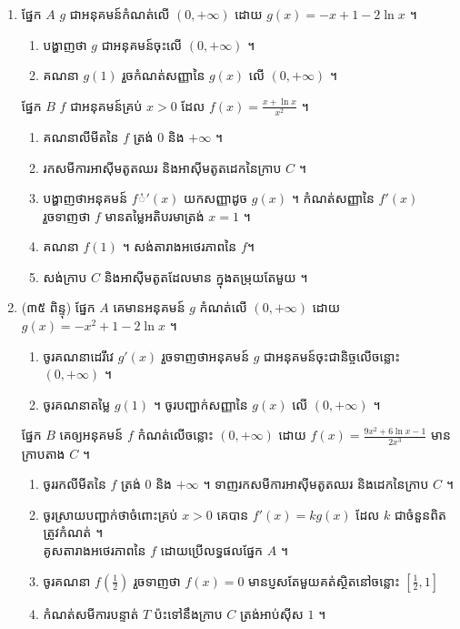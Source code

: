 \documentclass{officialexam}
\begin{document}
\begin{enumerate}[I]
\begin{enumerate}[k]
	\end{enumerate}
	\item {\color{khtug} \sffamily ផ្នែក $A$} $g$ ជាអនុគមន៍កំណត់លើ $(0,+\infty)$ ដោយ $g(x)=-x+1-2\ln x$ ។
	\begin{enumerate}[k]
		\item បង្ហាញថា $g$ ជាអនុគមន៍ចុះលើ $(0,+\infty)$ ។
		\item គណនា $g(1)$ រួចកំណត់សញ្ញានៃ $g(x)$ លើ $(0, +\infty)$ ។
	\end{enumerate}
	{\color{khtug} \sffamily ផ្នែក $B$} $f$ ជាអនុគមន៍គ្រប់ $x>0$ ដែល $f(x)=\frac{x+\ln x}{x^2}$ ។​
	\begin{enumerate}[k]
		\item គណនាលីមីតនៃ $f$ ត្រង់ $0$ និង $+\infty$ ។
		\item រកសមីការអាស៊ីមតូតឈរ និងអាស៊ីមតូតដេកនៃក្រាប $C$ ។
		\item បង្ហាញថាអនុគមន៍ $f់'(x)$ យកសញ្ញាដូច $g(x)$ ។ កំណត់សញ្ញានៃ $f'(x)$ រួចទាញថា $f$ មានតម្លៃអតិបរមាត្រង់ $x=1$ ។ 
		\item គណនា $f(1)$ ។ សង់តារាងអថេរភាពនៃ $f$​។
		\item សង់ក្រាប $C$ និងអាស៊ីមតូតដែលមាន ក្នុងតម្រុយតែមួយ ។
	\end{enumerate}
	\item {\color{khtug}(៣៥ ពិន្ទុ) \sffamily ផ្នែក $A$} គេមានអនុគមន៍ $g$ កំណត់លើ $(0, +\infty)$ ដោយ $g(x)=-x^2+1-2\ln x$ ។
	\begin{enumerate}[k]
		\item ចូរគណនាដេរីវេ $g'(x)$ រួចទាញថាអនុគមន៍ $g$ ជាអនុគមន៍ចុះជានិច្ចលើចន្លោះ $(0,+\infty)$ ។ 
		\item ចូរគណនាតម្លៃ $g(1)$ ។ ចូរបញ្ជាក់សញ្ញានៃ $g(x)$ លើ $(0, +\infty)$ ។
	\end{enumerate}
	{\color{khtug} \sffamily ផ្នែក $B$} គេឲ្យអនុគមន៍ $f$ កំណត់លើចន្លោះ $(0, +\infty)$ ដោយ $f(x)=\frac{9x^2+6\ln x-1}{2x^3}$ មានក្រាបតាង $C$ ។
	\begin{enumerate}[k]
		\item ចូររកលីមីតនៃ $f$ ត្រង់ $0$ និង $+\infty$ ។ ទាញរកសមីការអាស៊ីមតូតឈរ និងដេកនៃក្រាប $C$ ។
		\item ចូរស្រាយបញ្ជាក់ថាចំពោះគ្រប់ $x>0$ គេបាន $f'(x)=kg(x)$ ដែល $k$ ជាចំនួនពិតត្រូវកំណត់ ។​\\ គូសតារាងអថេរភាពនៃ $f$ ដោយប្រើលទ្ធផលផ្នែក $A$ ។
		\item ចូរគណនា $f\left(\frac{1}{2}\right)$ រួចទាញថា $f(x)=0$ មានប្ញសតែមួយគត់ស្ថិតនៅចន្លោះ $\left[\frac{1}{2},1\right]$
		\item កំណត់សមីការបន្ទាត់ $T$ ប៉ះទៅនឹងក្រាប $C$ ត្រង់អាប់ស៊ីស $1$ ។

\end{enumerate}
\end{enumerate}
\end{document}
